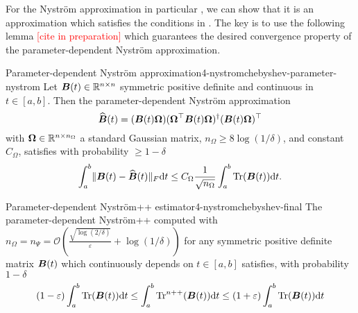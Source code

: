 For the Nystr\"om approximation in particular ,
we can show that it is an approximation which satisfies the conditions
in . The key is to use the following
lemma \textcolor{red}{[cite in preparation]} which guarantees the desired
convergence property of the parameter-dependent Nystr\"om approximation.

\begin{lemma}{Parameter-dependent Nystr\"om approximation}{4-nystromchebyshev-parameter-nystrom}
    Let $\boldsymbol{B}(t) \in \mathbb{R}^{n \times n}$ symmetric positive definite and continuous in $t \in [a, b]$. Then the parameter-dependent Nystr\"om approximation
    \begin{equation}
        \widehat{\boldsymbol{B}}(t) = (\boldsymbol{B}(t) \boldsymbol{\Omega}) (\boldsymbol{\Omega}^{\top} \boldsymbol{B}(t) \boldsymbol{\Omega})^{\dagger} (\boldsymbol{B}(t) \boldsymbol{\Omega})^{\top}
    \end{equation}
    with $\boldsymbol{\Omega} \in \mathbb{R}^{n \times n_{\Omega}}$ a standard Gaussian matrix, $n_{\Omega} \geq 8 \log(1/\delta)$, and constant $C_{\Omega}$, satisfies with probability $\geq 1 - \delta$
    \begin{equation}
        \int_{a}^{b} \lVert \boldsymbol{B}(t) - \widehat{\boldsymbol{B}}(t) \rVert _F \mathrm{d}t \leq C_{\Omega} \frac{1}{\sqrt{n_{\Omega}}} \int_{a}^{b} \operatorname{Tr}(\boldsymbol{B}(t)) \mathrm{d}t.
    \end{equation}
\end{lemma}

\begin{theorem}{Parameter-dependent Nystr\"om++ estimator}{4-nystromchebyshev-final}
    The parameter-dependent Nystr\"om++ computed with
    $n_{\Omega} = n_{\Psi} = \mathcal{O}\left( \frac{\sqrt{\log(2/\delta)}}{\varepsilon} + \log(1/\delta) \right)$
    for any symmetric positive definite matrix $\boldsymbol{B}(t)$ which continuously
    depends on $t \in [a, b]$ satisfies, with probability
    $1 - \delta$
    \begin{equation}
        (1 - \varepsilon) \int_{a}^{b}\operatorname{Tr}(\boldsymbol{B}(t)) \mathrm{d}t \leq \int_{a}^{b}\operatorname{Tr}^{n++}(\boldsymbol{B}(t)) \mathrm{d}t \leq  (1 + \varepsilon) \int_{a}^{b}\operatorname{Tr}(\boldsymbol{B}(t)) \mathrm{d}t
    \end{equation}
\end{theorem}

